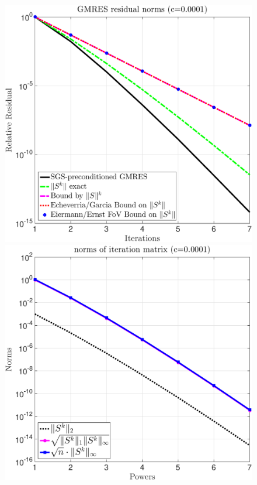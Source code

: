 \begin{figure}[h!]
\includegraphics[scale=0.20]{figures/Bounds_1e_neg4_500}
\includegraphics[scale=0.20]{figures/norm_1e_neg4_500_prec.eps}\\

\end{figure}
